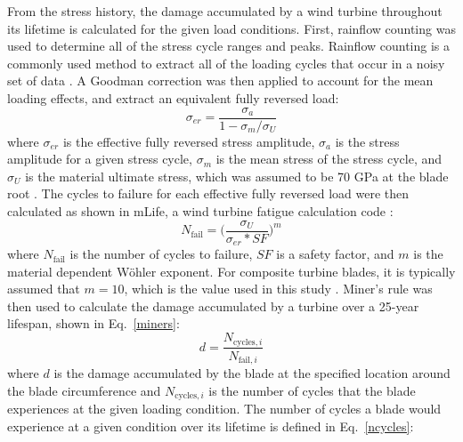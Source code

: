 \documentclass[11pt,letterpaper]{article}
\begin{document}
From the stress history, the damage accumulated by a wind turbine throughout its lifetime is calculated for the given load conditions.
First, rainflow counting was used to determine all of the stress cycle ranges and peaks. Rainflow counting is a commonly used method to extract all of the loading cycles that occur in a noisy set of data \cite{matsuishi1968fatigue}.
A Goodman correction was then applied to account for the mean loading effects, and extract an equivalent fully reversed load:
\begin{equation}
    \sigma_{er} = \frac{\sigma_a}{1-\sigma_m/\sigma_U}
    \label{goodman}
\end{equation}
\noindent where $\sigma_{er}$ is the effective fully reversed stress amplitude, $\sigma_{a}$ is the stress amplitude for a given stress cycle, $\sigma_{m}$ is the mean stress of the stress cycle, and $\sigma_{U}$ is the material ultimate stress, which was assumed to be 70 GPa at the blade root \cite{mandell2003new}.
% 
The cycles to failure for each effective fully reversed load were then calculated as shown in mLife, a wind turbine fatigue calculation code
\cite{hayman2012mlife}:
% 
\begin{equation}
    N_{\text{fail}} = \Big(\frac{\sigma_U}{\sigma_{er}*SF}\Big)^m
    \label{cycles}
\end{equation}
%
\noindent where $N_{\text{fail}}$ is the number of cycles to failure, $SF$ is a safety factor, and $m$ is the material dependent W\"{o}hler exponent. For composite turbine blades, it is typically assumed that $m=10$, which is the value used in this study \cite{Ingersoll2018}. 
Miner's rule was then used to calculate the damage accumulated by a turbine over a 25-year lifespan, shown in Eq.~\ref{miners}:
\begin{equation}
    d = \frac{N_{\text{cycles},i}}{N_{\text{fail},i}}
    \label{miners}
\end{equation}
\noindent where $d$ is the damage accumulated by the blade at the specified location around the blade circumference and $N_{\text{cycles},i}$ is the number of cycles that the blade experiences at the given loading condition. 
The number of cycles a blade would experience at a given condition over its lifetime is defined in Eq.~\ref{ncycles}:
\end{document}
